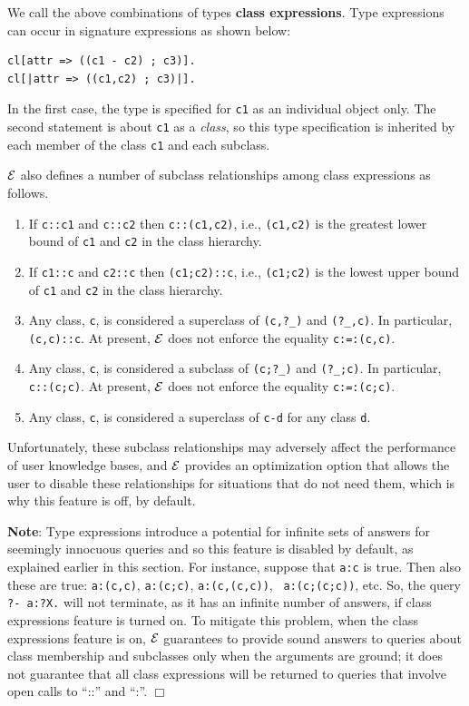 \documentclass[11pt]{article}
\newcommand{\ERGO}{\mbox{\ensuremath{\cal{E}}\smaller{{\sc{RGO}}}}\xspace}
\newcommand{\FLSYSTEM}{\ERGO}
\begin{document}
We call the above combinations of types {\bf class expressions}.  
Type expressions can occur in signature expressions as shown below:
\begin{verbatim}
cl[attr => ((c1 - c2) ; c3)].
cl[|attr => ((c1,c2) ; c3)|].
\end{verbatim}
In the first case, the type is specified for \texttt{c1} as an individual
object only.
The second statement is about \texttt{c1} as a \emph{class}, so this type
specification is inherited by each member of the class \texttt{c1} and each
subclass.   

\FLSYSTEM also defines a number of subclass relationships among class
expressions as follows.
\begin{enumerate}
\item If {\tt c::c1} and {\tt c::c2} then {\tt c::(c1,c2)}, i.e.,
  {\tt (c1,c2)} is the greatest lower bound of {\tt c1} and {\tt c2} in the
  class hierarchy.
\item If {\tt c1::c} and {\tt c2::c} then {\tt (c1;c2)::c}, i.e.,
  {\tt (c1;c2)} is the lowest upper bound of {\tt c1} and {\tt c2} in the
  class hierarchy. 
\item Any class, {\tt c}, is considered a superclass of {\tt (c,?\_)} and
  {\tt (?\_,c)}. In particular, {\tt (c,c)::c}. At present, \FLSYSTEM does not
  enforce the equality {\tt c:=:(c,c)}.      
\item Any class, {\tt c}, is considered a subclass of {\tt (c;?\_)} and
  {\tt (?\_;c)}. In particular, {\tt c::(c;c)}. At present, \FLSYSTEM does not
  enforce the equality {\tt c:=:(c;c)}.      
\item Any class, {\tt c}, is considered a superclass of {\tt c-d} for any
  class {\tt d}.   
\end{enumerate}
Unfortunately, these subclass relationships may adversely affect the
performance of user knowledge bases, and \FLSYSTEM provides an optimization
option that allows the user to disable these relationships for situations
that do not need them, which is why this feature is off, by default.

\noindent
{\bf Note}: Type expressions introduce a potential for infinite sets of answers
for seemingly innocuous queries and so this feature is disabled by default,
as explained earlier in this section. For instance, suppose that {\tt a:c} is
true. Then also these are true: {\tt a:(c,c)}, {\tt a:(c;c)}, {\tt a:(c,(c,c))}, {\tt
  a:(c;(c;c))}, etc. So, the query {\tt ?- a:?X.} will not terminate, as it
has an infinite number of answers, if class expressions feature is turned
on.
To mitigate this problem, when the class expressions feature is on,
\FLSYSTEM guarantees to provide sound answers to queries about class
membership and subclasses only when the arguments are ground; it does
not guarantee that all class expressions will be returned to 
queries that involve open calls to ``::'' and ``:''.
\hfill$\Box$
\end{document}
